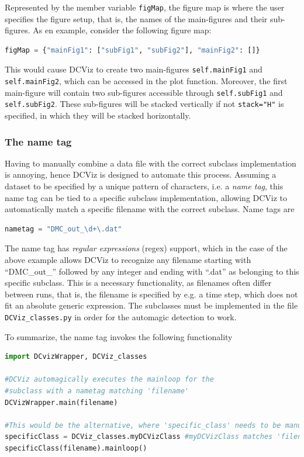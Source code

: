Represented by the member variable \verb+figMap+, the figure map is where the user specifies the figure setup, that is, the names of the main-figures and their sub-figures. As en example, consider the following figure map:  

\begin{lstlisting}[language=Python]
figMap = {"mainFig1": ["subFig1", "subFig2"], "mainFig2": []} 
\end{lstlisting}

This would cause DCViz to create two main-figures \verb+self.mainFig1+ and \verb+self.mainFig2+, which can be accessed in the plot function. Moreover, the first main-figure will contain two sub-figures accessible through \verb+self.subFig1+ and \verb+self.subFig2+. These sub-figures will be stacked vertically if not \verb+stack="H"+ is specified, in which they will be stacked horizontally. 


\subsubsection{The name tag}

Having to manually combine a data file with the correct subclass implementation is annoying, hence DCViz is designed to automate this process. Assuming a dataset to be specified by a unique pattern of characters, i.e. a \textit{name tag}, this name tag can be tied to a specific subclass implementation, allowing DCViz to automatically match a specific filename with the correct subclass. Name tags are

\begin{lstlisting}[language=Python]
 nametag = "DMC_out_\d+\.dat"
\end{lstlisting}

The name tag has \textit{regular expressions} (regex) support, which in the case of the above example allows DCViz to recognize any filename starting with ``DMC\_out\_'' followed by any integer and ending with ``.dat'' as belonging to this specific subclass. This is a necessary functionality, as filenames often differ between runs, that is, the filename is specified by e.g. a time step, which does not fit an absolute generic expression. The subclasses must be implemented in the file \verb+DCViz_classes.py+ in order for the automagic detection to work.

To summarize, the name tag invokes the following functionality

\begin{lstlisting}[language=Python]
import DCvizWrapper, DCViz_classes

#DCViz automagically executes the mainloop for the 
#subclass with a nametag matching 'filename'
DCVizWrapper.main(filename) 

#This would be the alternative, where 'specific_class' needs to be manually selected.
specificClass = DCViz_classes.myDCVizClass #myDCVizClass matches 'filename'
specificClass(filename).mainloop()
\end{lstlisting}



